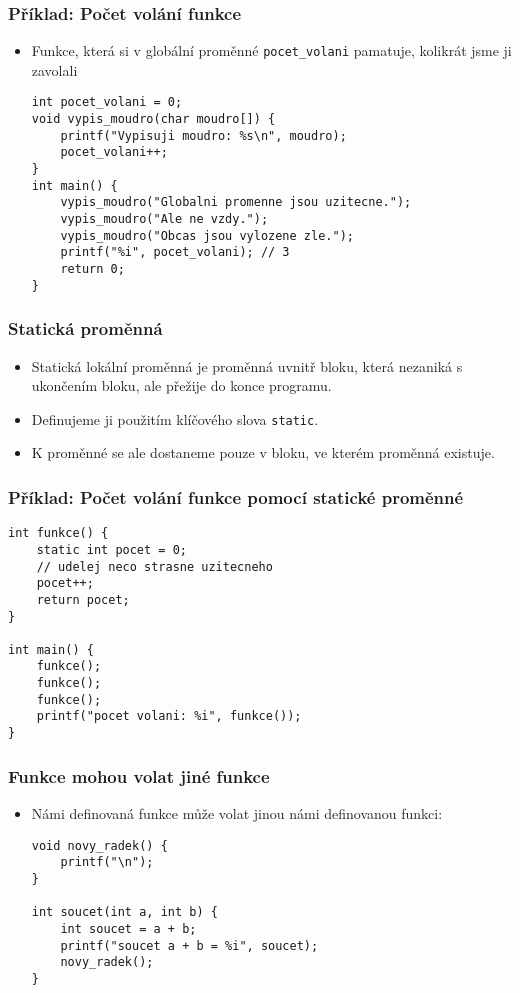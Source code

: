 \documentclass{beamer}
\newenvironment{itemizex}%
  {\large \begin{itemize}%
    \setlength{\itemsep}{8pt}%
    \setlength{\parskip}{8pt}}%
  {\end{itemize}}
\begin{document}
\begin{frame}[t,fragile]\frametitle{Příklad: Počet volání funkce} 
    \begin{itemize}
        \item Funkce, která si v globální proměnné \texttt{pocet\_volani} pamatuje, kolikrát jsme ji zavolali
        \begin{verbatim} 
int pocet_volani = 0;
void vypis_moudro(char moudro[]) {
    printf("Vypisuji moudro: %s\n", moudro);
    pocet_volani++;
}
int main() {
    vypis_moudro("Globalni promenne jsou uzitecne.");
    vypis_moudro("Ale ne vzdy.");
    vypis_moudro("Obcas jsou vylozene zle.");
    printf("%i", pocet_volani); // 3
    return 0;
}
        \end{verbatim}
    \end{itemize}
\end{frame}


\begin{frame}[t,fragile]\frametitle{Statická proměnná} 
    \begin{itemizex}
        \item Statická lokální proměnná je proměnná uvnitř bloku, která nezaniká s ukončením bloku, ale přežije do konce programu.
        \item Definujeme ji použitím klíčového slova \texttt{static}.
        \item K proměnné se ale dostaneme pouze v bloku, ve kterém proměnná existuje.
    \end{itemizex}
\end{frame}


\begin{frame}[t,fragile]\frametitle{Příklad: Počet volání funkce pomocí statické proměnné} 
    \begin{verbatim} 
int funkce() {
    static int pocet = 0;
    // udelej neco strasne uzitecneho
    pocet++;
    return pocet;
}

int main() {
    funkce();
    funkce();
    funkce();
    printf("pocet volani: %i", funkce());
}
    \end{verbatim}
\end{frame}


\begin{frame}[t,fragile]\frametitle{Funkce mohou volat jiné funkce} 
    \begin{itemizex}
        \item Námi definovaná funkce může volat jinou námi definovanou funkci:
        \begin{verbatim} 
void novy_radek() {
    printf("\n");
}

int soucet(int a, int b) {
    int soucet = a + b;
    printf("soucet a + b = %i", soucet);
    novy_radek();
}
        \end{verbatim}
    \end{itemizex}
\end{frame}
\end{document}
